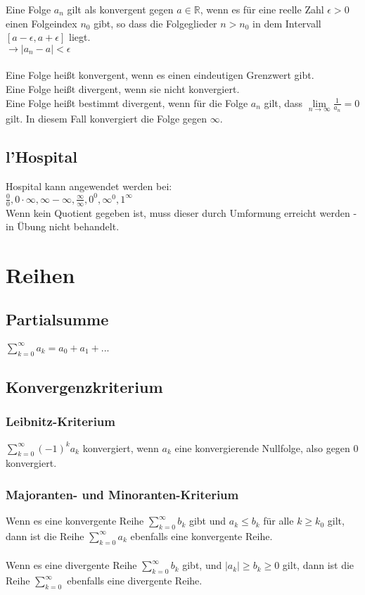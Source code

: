\documentclass[a4paper,landscape, 11pt]{article}
\newcommand{\limFromTo}[2]{ \lim\limits_{#2 \rightarrow #1}}
\begin{document}
\begin{multicols}{4}
\begin{small}
            Eine Folge $a_n$ gilt als konvergent gegen $a \in \mathbb{R}$, wenn es für eine reelle Zahl $\epsilon > 0$ einen Folgeindex $n_0$ gibt, so dass die Folgeglieder $n>n_0$ in dem Intervall $\left[ a - \epsilon, a + \epsilon \right] $ liegt.\\
            $\rightarrow | a_n - a | < \epsilon$
            \\ \\
            Eine Folge heißt konvergent, wenn es einen eindeutigen Grenzwert gibt. \\
            Eine Folge heißt divergent, wenn sie nicht konvergiert. \\
            Eine Folge heißt bestimmt divergent, wenn für die Folge $a_n$ gilt, dass $\limFromTo{\infty}{n}\frac{1}{a_n} = 0$ gilt. In diesem Fall konvergiert die Folge gegen $\infty$.
        \subsection{l'Hospital}
            Hospital kann angewendet werden bei: \\
            $\frac{0}{0}, 0 \cdot \infty, \infty - \infty, \frac{\infty}{\infty}, 0^0, \infty^0, 1^\infty$\\
            Wenn kein Quotient gegeben ist, muss dieser durch Umformung erreicht werden - in Übung nicht behandelt.
    
    \section{Reihen}
        \subsection{Partialsumme}
            $\sum_{k=0}^{\infty} a_k = a_0 + a_1 + ... $
        \subsection{Konvergenzkriterium}
            \subsubsection{Leibnitz-Kriterium}
                $\sum_{k=0}^{\infty} (-1)^k a_k$ konvergiert, wenn $a_k$ eine konvergierende Nullfolge, also gegen 0 konvergiert.        
            \subsubsection{Majoranten- und Minoranten-Kriterium}
                Wenn es eine konvergente Reihe $\sum_{k=0}^{\infty}b_k$ gibt und $a_k \le b_k$ für alle $k \ge k_0$ gilt, dann ist die Reihe $\sum_{k=0}^{\infty}a_k$ ebenfalls eine konvergente Reihe.
                \\ \\
                Wenn es eine divergente Reihe $\sum_{k=0}^{\infty}b_k$ gibt,  und $|a_k| \ge b_k \ge 0$ gilt, dann ist die Reihe $\sum_{k=0}^{\infty}$ ebenfalls eine divergente Reihe.

\end{small}
\end{multicols}
\end{document}

